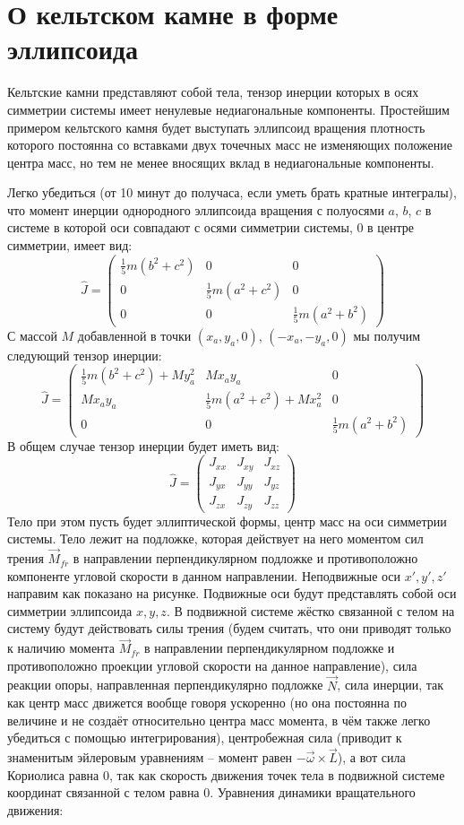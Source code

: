 \section{О кельтском камне в форме эллипсоида}

Кельтские камни представляют собой тела, тензор инерции которых в осях симметрии системы имеет ненулевые недиагональные компоненты. Простейшим примером кельтского камня будет выступать эллипсоид вращения плотность которого постоянна со вставками двух точечных масс не изменяющих положение центра масс, но тем не менее вносящих вклад в недиагональные компоненты.

Легко убедиться (от 10 минут до получаса, если уметь брать кратные интегралы), что момент инерции однородного эллипсоида вращения с полуосями $a$, $b$, $c$ в системе в которой оси совпадают с осями симметрии системы, 0 в центре симметрии, имеет вид:
\[
	\hat{J} = 
	\begin{pmatrix}
	\frac{1}{5}m(b^2 + c^2) & 0 & 0 \\
	0 & \frac{1}{5}m(a^2 + c^2) & 0 \\
	0 & 0 & \frac{1}{5}m(a^2 + b^2) 
	\end{pmatrix}
\]
С массой $M$ добавленной в точки $(x_a, y_a, 0)$,  $(-x_a, -y_a, 0)$ мы получим следующий тензор инерции:
\[
	\hat{J} = 
	\begin{pmatrix}
	\frac{1}{5}m(b^2 + c^2) + M y_a^2 & M x_a y_a & 0 \\
	M x_a y_a & \frac{1}{5}m(a^2 + c^2) + M x_a^2 & 0 \\
	0 & 0 & \frac{1}{5}m(a^2 + b^2) 
	\end{pmatrix}
\]
В общем случае тензор инерции будет иметь вид:
\[
	\hat{J} = 
	\begin{pmatrix}
	J_{xx} & J_{xy} & J_{xz} \\
	J_{yx} & J_{yy} & J_{yz} \\
	J_{zx} & J_{zy} & J_{zz} 
	\end{pmatrix}
\]
Тело при этом пусть будет эллиптической формы, центр масс на оси симметрии системы. Тело лежит на подложке, которая действует на него моментом сил трения $\vec{M}_{fr}$ в направлении перпендикулярном подложке и противоположно компоненте угловой скорости в данном направлении. Неподвижные оси $x', y', z'$ направим как показано на рисунке. Подвижные оси будут представлять собой оси симметрии эллипсоида $x, y, z$. В подвижной системе жёстко связанной с телом на систему будут действовать силы трения (будем считать, что они приводят только к наличию момента $\vec{M}_{fr}$ в направлении перпендикулярном подложке и противоположно проекции угловой скорости на данное направление), сила реакции опоры, направленная перпендикулярно подложке $\vec{N}$, сила инерции, так как центр масс движется вообще говоря ускоренно (но она постоянна по величине и не создаёт относительно центра масс момента, в чём также легко убедиться с помощью интегрирования), центробежная сила (приводит к знаменитым эйлеровым уравнениям -- момент равен $-\vec{\omega}\times\vec{L}$), а вот сила Кориолиса равна 0, так как скорость движения точек тела в подвижной системе координат связанной с телом равна 0. Уравнения динамики вращательного движения:

